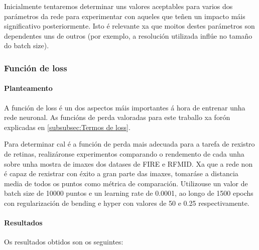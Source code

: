 Inicialmente tentaremos determinar uns valores aceptables para varios dos parámetros da rede para experimentar con aqueles que teñen un impacto máis significativo posteriormente.
Isto é relevante xa que moitos destes parámetros son dependentes uns de outros (por exemplo, a resolución utilizada inflúe no tamaño do batch size).

\subsubsection{Función de loss}
\label{subsubsec:Función de loss}

\paragraph{Planteamento}
\label{par:Planteamento}

A función de loss é un dos aspectos máis importantes á hora de entrenar unha rede neuronal.
As funcións de perda valoradas para este traballo xa forón explicadas en \ref{subsubsec:Termos de loss}.

Para determinar cal é a función de perda mais adecuada para a tarefa de rexistro de retinas, realizáronse experimentos comparando o rendemento de cada unha sobre unha mostra de imaxes dos datases de FIRE e RFMID.
Xa que a rede non é capaz de rexistrar con éxito a gran parte das imaxes, tomaráse a distancia media de todos os puntos como métrica de comparación.
Utilizouse un valor de batch size de 10000 puntos e un learning rate de 0.0001, ao longo de 1500 epochs con regularización de bending e hyper con valores de 50 e 0.25 respectivamente.

\paragraph{Resultados}
\label{par:Resultados}

Os resultados obtidos son os seguintes:



